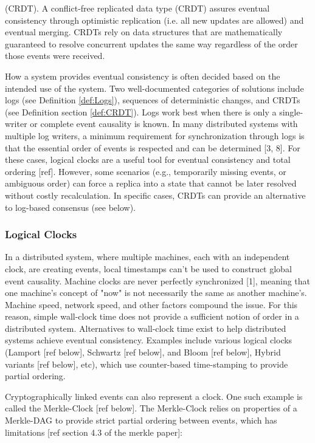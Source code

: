 \documentclass{comjnl}
\begin{document}
\begin{definition} (CRDT). A conflict-free replicated data type (CRDT) assures eventual consistency through optimistic replication (i.e. all new updates are allowed) and eventual merging. CRDTs rely on data structures that are mathematically guaranteed to resolve concurrent updates the same way regardless of the order those events were received. \end{definition} \label{def:CRDT}

How a system provides eventual consistency is often decided based on the intended use of the system. Two well-documented categories of solutions include logs (see Definition  \ref{def:Logs}), sequences of deterministic changes, and CRDTs (see Definition section  \ref{def:CRDT}). Logs work best when there is only a single-writer or complete event causality is known. In many distributed systems with multiple log writers, a minimum requirement for synchronization through logs is that the essential order of events is respected and can be determined [3, 8]. For these cases, logical clocks are a useful tool for eventual consistency and total ordering [ref]. However, some scenarios (e.g., temporarily missing events, or ambiguous order) can force a replica into a state that cannot be later resolved without costly recalculation. In specific cases, CRDTs can provide an alternative to log-based consensus (see below). 

\subsubsection{Logical Clocks}

In a distributed system, where multiple machines, each with an independent clock, are creating events, local timestamps can’t be used to construct global event causality. Machine clocks are never perfectly synchronized [1], meaning that one machine's concept of "now" is not necessarily the same as another machine's. Machine speed, network speed, and other factors compound the issue. For this reason, simple wall-clock time does not provide a sufficient notion of order in a distributed system. Alternatives to wall-clock time exist to help distributed systems achieve eventual consistency. Examples include various logical clocks (Lamport [ref below], Schwartz [ref below], and Bloom [ref below], Hybrid variants [ref below], etc), which use counter-based time-stamping to provide partial ordering. 

Cryptographically linked events can also represent a clock. One such example is called the Merkle-Clock [ref below]. The Merkle-Clock relies on properties of a Merkle-DAG to provide strict partial ordering between events, which has limitations [ref section 4.3 of the merkle paper]:
\end{document}
